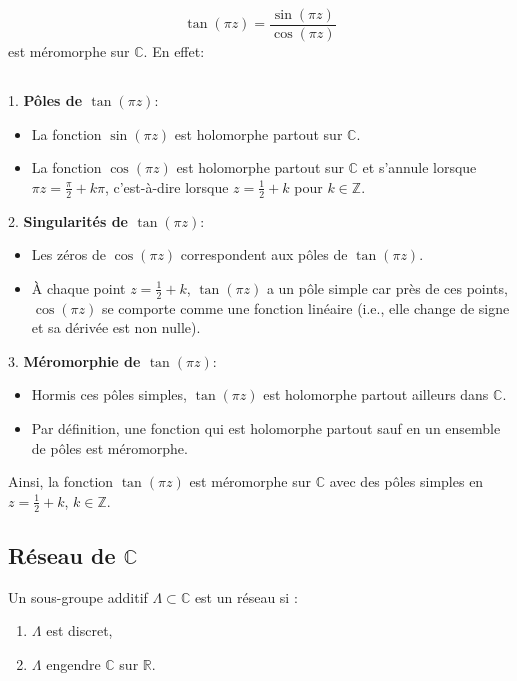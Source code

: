 \documentclass[12pt]{article}
\begin{document}
\[ \tan(\pi z) = \frac{\sin(\pi z)}{\cos(\pi z)} \]
est méromorphe sur \( \mathbb{C} \). En effet:
\subsection*{}
1. \textbf{Pôles de \(\tan(\pi z)\)}:
\begin{itemize}
	\item La fonction \(\sin(\pi z)\) est holomorphe partout sur \( \mathbb{C} \).
	\item La fonction \(\cos(\pi z)\) est holomorphe partout sur \( \mathbb{C} \) et s'annule lorsque \(\pi z = \frac{\pi}{2} + k\pi\), c'est-à-dire lorsque \( z = \frac{1}{2} + k \) pour \( k \in \mathbb{Z} \).
\end{itemize}

2. \textbf{Singularités de \(\tan(\pi z)\)}:
\begin{itemize}
	\item Les zéros de \(\cos(\pi z)\) correspondent aux pôles de \(\tan(\pi z)\).
	\item À chaque point \( z = \frac{1}{2} + k \), \( \tan(\pi z) \) a un pôle simple car près de ces points, \(\cos(\pi z)\) se comporte comme une fonction linéaire (i.e., elle change de signe et sa dérivée est non nulle).
\end{itemize}

3. \textbf{Méromorphie de \(\tan(\pi z)\)}:
\begin{itemize}
	\item Hormis ces pôles simples, \(\tan(\pi z)\) est holomorphe partout ailleurs dans \( \mathbb{C} \).
	\item Par définition, une fonction qui est holomorphe partout sauf en un ensemble de pôles est méromorphe.
\end{itemize}

Ainsi, la fonction \(\tan(\pi z)\) est méromorphe sur \( \mathbb{C} \) avec des pôles simples en \( z = \frac{1}{2} + k \), \( k \in \mathbb{Z} \).


\subsection{Réseau de $\mathbb{C}$}
Un sous-groupe additif $\Lambda \subset \mathbb{C}$ est un réseau si :
\begin{enumerate}
    \item $\Lambda$ est discret,
    \item $\Lambda$ engendre $\mathbb{C}$ sur $\mathbb{R}$.
\end{enumerate}
\end{document}
